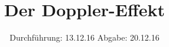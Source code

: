 

\subject{V104}
\title{Der Doppler-Effekt}
\date{
  Durchführung: 13.12.16
  \hspace{3em}
  Abgabe: 20.12.16
}



\maketitle
\thispagestyle{empty}
\tableofcontents
\newpage






\printbibliography


